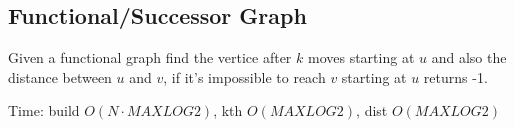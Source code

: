 \subsection{Functional/Successor Graph}

Given a functional graph find the vertice after $k$ moves starting at $u$ and also the distance between $u$ and $v$, if it's impossible to reach $v$ starting at $u$ returns -1.

Time: build $O(N \cdot MAXLOG2)$, kth $O(MAXLOG2)$, dist $O(MAXLOG2)$
